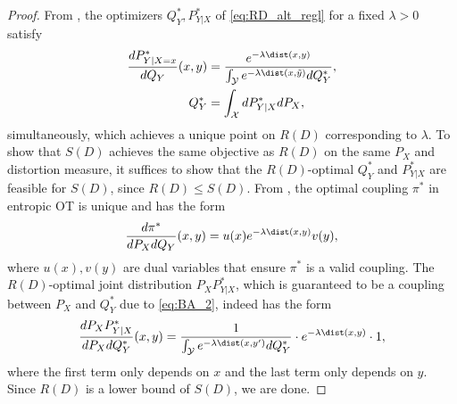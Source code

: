 \documentclass{article} %
\begin{document}
        \mainthm*
        \begin{proof}
        From \cite[Ch.~9]{CoverThomas}, the optimizers $Q^*_Y, P^*_{Y|X}$ of \eqref{eq:RD_alt_regl} for a fixed $\lambda > 0$ satisfy
        \begin{align}
            \frac{dP^*_{Y|X=x}}{dQ_Y}(x,y) &= \frac{e^{-\lambda \dist(x,y)}}{\int_{\mathcal{Y}} e^{-\lambda \dist(x,\tilde{y})}dQ^*_Y} , \label{eq:BA_1} \\
            Q^*_Y &= \int_{\mathcal{X}}  dP^*_{Y|X} dP_X, 
            \label{eq:BA_2}
        \end{align}
        simultaneously, which achieves a unique point on $R(D)$ corresponding to $\lambda$. 
             To show that $S(D)$ achieves the same objective as $R(D)$ on the same $P_X$ and distortion measure, it suffices to show that the $R(D)$-optimal $Q_Y^*$ and $P_{Y|X}^*$ are feasible for $S(D)$, since $R(D) \leq S(D)$. From \cite[Ch.~4, Prop.~4.3]{ComputationalOT}, the optimal coupling $\pi^*$ in entropic OT is unique and has the form 
            \begin{equation}
            \frac{d\pi^*}{dP_X dQ_Y} (x,y) = u(x) e^{-\lambda \dist(x,y)} v(y),
            \end{equation}
            where $u(x), v(y)$ are dual variables that ensure $\pi^*$ is a valid coupling. The $R(D)$-optimal joint distribution $P_XP_{Y|X}^*$, which is guaranteed to be a coupling between $P_X$ and $Q_Y^*$ due to \eqref{eq:BA_2}, indeed has the form
            \begin{equation}
                \frac{dP_XP_{Y|X}^*}{dP_X dQ_Y^*}(x,y) = \frac{1}{\int_{\mathcal{Y}}e^{-\lambda \dist(x,y')}dQ_Y^*} \cdot e^{-\lambda \dist(x,y)} \cdot 1,
            \end{equation}
           where the first term only depends on $x$ and the last term only depends on $y$.
            Since $R(D)$ is a lower bound of $S(D)$, we are done.
        \end{proof}
\end{document}
